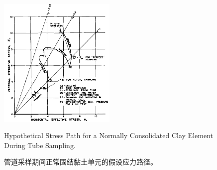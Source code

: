 \begin{figure}[!htb]
    \centering
    \includegraphics[width=0.5\textwidth]{figures/figure-3.png}
    \caption{Hypothetical Stress Path for a Normally Consolidated Clay Element During Tube Sampling.}
    \addtocounter{figure}{-1}
    \vspace{-5pt}
    \renewcommand{\figurename}{图}
    \caption{管道采样期间正常固结黏土单元的假设应力路径。}
    \renewcommand{\figurename}{Figure}
    \label{figure:3}
\end{figure}